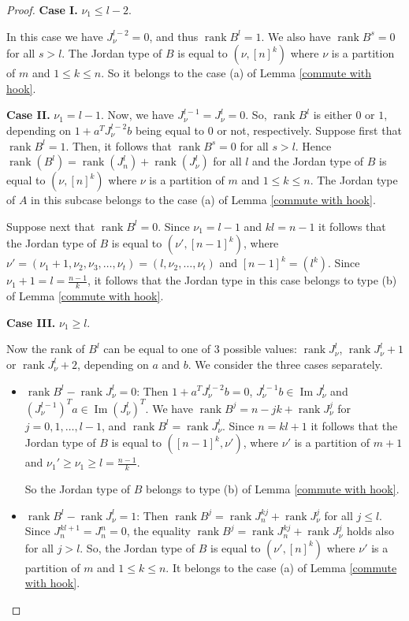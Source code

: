 \documentclass[11pt]{amsproc}
\DeclareMathOperator{\im}{Im}
\DeclareMathOperator{\rank}{rank}
\begin{document}
\begin{proof}
{\bf Case I.} $\nu_1\leq l-2$.

In this case we have $J_{\nu}^{l-2}=0$, and thus $\rank B^{l}=1$. We also have $\rank B^{s}=0$ for all $s>l$. The Jordan type of $B$ is equal to 
$\left(\nu, [n]^k\right)$ where $\nu$ is a partition of $m$ and $1\leq k\leq n$. So it belongs to the case (a) of Lemma \ref{commute with hook}.

{\bf Case II.} $\nu_1= l-1.$
Now, we have $J_{\nu}^{l-1} =J_{\nu} ^l=0$. So, $\rank B^l$ is either $0$ or $1$, depending on $1+a^TJ_{\nu}^{l-2}b$ being equal to $0$ or not, respectively. Suppose first that $\rank B^l=1$. Then, it follows that $\rank B^{s}=0$ for all $s>l$. Hence $\rank(B^l)=\rank(J_n^l)+\rank(J_{\nu}^l )$ for all $l$ and the Jordan type of $B$ is equal to 
$\left(\nu, [n]^k\right)$ where $\nu$ is a partition of $m$ and $1\leq k\leq n$. The Jordan type of $A$ in this subcase belongs to the case (a) of Lemma \ref{commute with hook}.

Suppose next that $\rank B^l=0$. Since $\nu_1=l-1$ and $kl=n-1$ it follows that the Jordan type of $B$ is equal to $\left(\nu', [n-1]^k\right)$, where $\nu'=(\nu_1+1,\nu_2,\nu_3,\ldots, \nu_t)=(l,\nu_2,\ldots,\nu_t)$ and $[n-1]^k=(l^k)$. Since $\nu_1+1=l=\frac{n-1}{k}$, it follows that the Jordan type in this case belongs to type (b) of Lemma \ref{commute with hook}.

{\bf Case III.} $\nu_1\ge l.$

Now the rank of $B^l$ can be equal to one of $3$ possible values: $\rank J_{\nu}^l$, $\rank J_{\nu}^l+1$ or $\rank J_{\nu}^l+2$, depending on $a$ and $b$. We consider the three cases separately.

\begin{itemize}
    \item[(i)] $\rank B^l-\rank J_{\nu}^l=0$: Then $1+a^TJ_{\nu}^{l-2}b=0 $, $J_{\nu}^{l-1}b\in\im J_{\nu}^l $ and $\left(J_{\nu}^{l-1}\right)^Ta\in\im \left(J_{\nu}^l\right)^T $. We have $\rank B^j=n-jk+\rank J_{\nu}^j $ for $j=0,1,\ldots,l-1$, and $\rank B^l=\rank J_{\nu}^l $. Since $n=kl+1$ it follows that the Jordan type of $B$ is equal to $([n-1]^k,\nu' ) $, where $\nu'$ is a partition of $m+1$ and $\nu_1'\ge\nu_1\ge l  = \frac{n-1}{k} $. 

So the Jordan type of $B$ belongs to type (b) of Lemma \ref{commute with hook}.

\item[(ii)] $\rank B^l-\rank J_{\nu}^l=1$: Then $\rank B^j=\rank J_n^{kj}+\rank J_{\nu}^j $ for all $j\leq l$. Since $J_n^{kl+1}=J_n^n=0$, the equality $\rank B^j=\rank J_n^{kj}+\rank J_{\nu}^j$ holds also for all $j> l$.  So, the Jordan type of $B$ is equal to $\left(\nu', [n]^k\right)$ where $\nu'$ is a partition of $m$ and $1\leq k\leq n$. It belongs to the case (a) of Lemma \ref{commute with hook}.


\end{itemize}
\end{proof}
\end{document}
